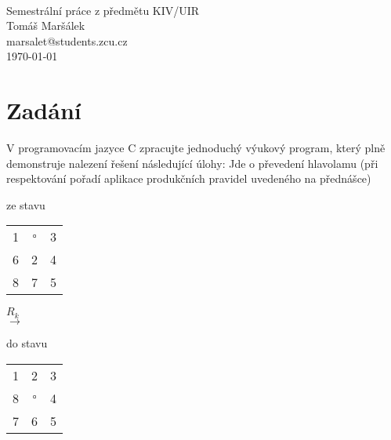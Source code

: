 \documentclass[12pt]{article}
\begin{document}
\begin{titlepage}
\begin{center}
	\mbox{} \\[3cm]
	\huge{Semestrální práce z předmětu KIV/UIR} \\[2.5cm]
	\Large{Tomáš Maršálek} \\
	\large{marsalet@students.zcu.cz} \\[1cm]
	\normalsize{\today}
\end{center}
\thispagestyle{empty}
\end{titlepage}

\section{Zadání}
V programovacím jazyce C zpracujte jednoduchý výukový program, který plně
demonstruje nalezení řešení následující úlohy: Jde o převedení hlavolamu 
(při respektování pořadí aplikace produkčních pravidel uvedeného na přednášce)

\vspace{.3cm}

\begin{center}
\begin{minipage}[b]{.3\textwidth}
\centering
ze stavu \\
\vspace{.1cm}
\begin{LARGE}
\begin{tabular}{|ccc|}
\hline
1 &  $\square$ & 3 \\
6 & 2 & 4 \\
8 & 7 & 5 \\
\hline
\end{tabular}
\end{LARGE}
\end{minipage}
\begin{minipage}[b]{.2\textwidth}
{\large $R_k$} \\
$\longrightarrow$
\end{minipage}
\begin{minipage}[b]{.3\textwidth}
\centering
do stavu \\
\vspace{.1cm}
\begin{LARGE}
\begin{tabular}{|ccc|}
\hline
1 & 2 & 3 \\
8 & $\square$ & 4 \\
7 & 6 & 5 \\
\hline
\end{tabular}
\end{LARGE}
\end{minipage}
\end{center}
\end{document}
